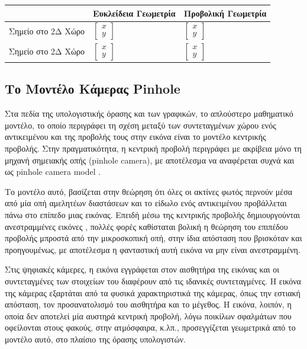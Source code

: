 \begin{tabu} to 0.9\textwidth { | X[l] | X[c,m] | X[c,m] | }
   \hline
    & Ευκλείδεια Γεωμετρία & Προβολική Γεωμετρία \\[0.5cm]
   \hline
   Σημείο στο 2Δ Χώρο  & $\begin{bmatrix} x \\ y\end{bmatrix}$  & $\begin{bmatrix} x \\ y\end{bmatrix}$  \\[1cm]
   \hline
   Σημείο στο 2Δ Χώρο  & $\begin{bmatrix} x \\ y\end{bmatrix}$  & $\begin{bmatrix} x \\ y\end{bmatrix}$  \\[1cm]
   \hline
\end{tabu}




\subsection{Το Μοντέλο Κάμερας Pinhole}


Στα πεδία της υπολογιστικής όρασης και των γραφικών, το απλούστερο μαθηματικό μοντέλο, το οποίο περιγράφει τη σχέση μεταξύ των συντεταγμένων χώρου ενός αντικειμένου και της προβολής τους στην εικόνα είναι το μοντέλο κεντρικής προβολής. Στην πραγματικότητα, η κεντρική προβολή περιγράφει με ακρίβεια μόνο τη μηχανή σημειακής οπής (pinhole camera), με αποτέλεσμα να αναφέρεται συχνά και ως pinhole camera model \cite{hartley2003multiple} .


Το μοντέλο αυτό, βασίζεται στην θεώρηση ότι όλες οι ακτίνες φωτός περνούν μέσα από μία οπή αμελητέων διαστάσεων και το είδωλο ενός αντικειμένου προβάλλεται πάνω στο επίπεδο μιας εικόνας. Επειδή μέσω της κεντρικής προβολής δημιουργούνται ανεστραμμένες εικόνες \cite{fig:pinhole3}, πολλές φορές καθίσταται βολική η θεώρηση του επιπέδου προβολής μπροστά από την μικροσκοπική οπή, στην ίδια απόσταση που βρισκόταν και προηγουμένως, με αποτέλεσμα η φανταστική αυτή εικόνα να μην είναι ανεστραμμένη. 



Στις ψηφιακές κάμερες, η εικόνα εγγράφεται στον αισθητήρα της εικόνας και οι συντεταγμένες των στοιχείων του διαφέρουν από τις ιδανικές συντεταγμένες. Η εικόνα της κάμερας εξαρτάται από τα φυσικά χαρακτηριστικά της κάμερας, όπως την εστιακή απόσταση, τον προσανατολισμό του αισθητήρα και το μέγεθος. H εικόνα, λοιπόν, η οποία δεν αποτελεί μία αυστηρά κεντρική προβολή, λόγω ποικίλων σφαλμάτων που οφείλονται στους φακούς, στην ατμόσφαιρα, κ.λπ., προσεγγίζεται γεωμετρικά από το μοντέλο αυτό, στο πλαίσιο της όρασης υπολογιστών.



